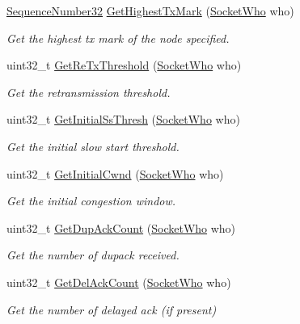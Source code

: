 \begin{DoxyCompactItemize}
\hyperlink{group__network_gacb2070e4e98d2d5135c9bede58f07a03}{Sequence\+Number32} \hyperlink{classns3_1_1TcpGeneralTest_ad70a5d33eba11317309c36cba2963eeb}{Get\+Highest\+Tx\+Mark} (\hyperlink{classns3_1_1TcpGeneralTest_a29338e6b7137cad650c2ff835713f6ee}{Socket\+Who} who)
\begin{DoxyCompactList}\small\item\em Get the highest tx mark of the node specified. \end{DoxyCompactList}\item 
uint32\+\_\+t \hyperlink{classns3_1_1TcpGeneralTest_a57c1da0bac0011d7984e90648a501633}{Get\+Re\+Tx\+Threshold} (\hyperlink{classns3_1_1TcpGeneralTest_a29338e6b7137cad650c2ff835713f6ee}{Socket\+Who} who)
\begin{DoxyCompactList}\small\item\em Get the retransmission threshold. \end{DoxyCompactList}\item 
uint32\+\_\+t \hyperlink{classns3_1_1TcpGeneralTest_a6c0df1a4cfd7c5d60ac7efad8eaead01}{Get\+Initial\+Ss\+Thresh} (\hyperlink{classns3_1_1TcpGeneralTest_a29338e6b7137cad650c2ff835713f6ee}{Socket\+Who} who)
\begin{DoxyCompactList}\small\item\em Get the initial slow start threshold. \end{DoxyCompactList}\item 
uint32\+\_\+t \hyperlink{classns3_1_1TcpGeneralTest_aed31a12eaeeae622d7758fa004bbb8a8}{Get\+Initial\+Cwnd} (\hyperlink{classns3_1_1TcpGeneralTest_a29338e6b7137cad650c2ff835713f6ee}{Socket\+Who} who)
\begin{DoxyCompactList}\small\item\em Get the initial congestion window. \end{DoxyCompactList}\item 
uint32\+\_\+t \hyperlink{classns3_1_1TcpGeneralTest_a611c694a4584d9cb3bea28fb0eafa8de}{Get\+Dup\+Ack\+Count} (\hyperlink{classns3_1_1TcpGeneralTest_a29338e6b7137cad650c2ff835713f6ee}{Socket\+Who} who)
\begin{DoxyCompactList}\small\item\em Get the number of dupack received. \end{DoxyCompactList}\item 
uint32\+\_\+t \hyperlink{classns3_1_1TcpGeneralTest_a1428f04ca89408a75aa4cdd1cf23acff}{Get\+Del\+Ack\+Count} (\hyperlink{classns3_1_1TcpGeneralTest_a29338e6b7137cad650c2ff835713f6ee}{Socket\+Who} who)
\begin{DoxyCompactList}\small\item\em Get the number of delayed ack (if present) \end{DoxyCompactList}\item 

\end{DoxyCompactItemize}
